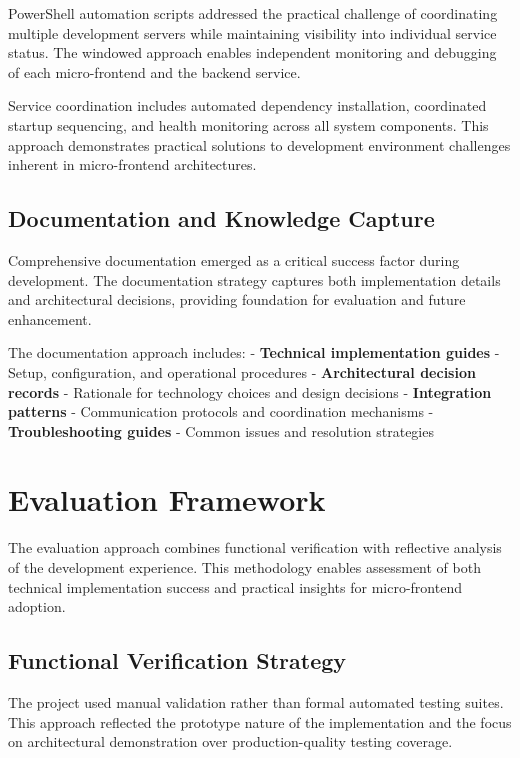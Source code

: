 \documentclass[12pt,a4paper]{report}
\begin{document}
PowerShell automation scripts addressed the practical challenge of coordinating multiple development servers while maintaining visibility into individual service status. The windowed approach enables independent monitoring and debugging of each micro-frontend and the backend service.

Service coordination includes automated dependency installation, coordinated startup sequencing, and health monitoring across all system components. This approach demonstrates practical solutions to development environment challenges inherent in micro-frontend architectures.

\subsection{Documentation and Knowledge Capture}

Comprehensive documentation emerged as a critical success factor during development. The documentation strategy captures both implementation details and architectural decisions, providing foundation for evaluation and future enhancement.

The documentation approach includes:
- \textbf{Technical implementation guides} - Setup, configuration, and operational procedures
- \textbf{Architectural decision records} - Rationale for technology choices and design decisions  
- \textbf{Integration patterns} - Communication protocols and coordination mechanisms
- \textbf{Troubleshooting guides} - Common issues and resolution strategies

\section{Evaluation Framework}

The evaluation approach combines functional verification with reflective analysis of the development experience. This methodology enables assessment of both technical implementation success and practical insights for micro-frontend adoption.

\subsection{Functional Verification Strategy}

The project used manual validation rather than formal automated testing suites. This approach reflected the prototype nature of the implementation and the focus on architectural demonstration over production-quality testing coverage.
\end{document}

